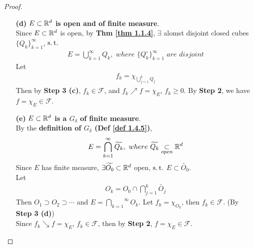 \begin{proof}
\begin{itemize}
\begin{enumerate}
				\item[\textbf{(d)}]\textbf{$E \subset \mathbb{R}^d$ is open and of finite measure}. \\
				Since $E \subset \mathbb{R}^d$ is open, by \textbf{Thm \ref{thm 1.1.4}}, $\exists$ alomst disjoint closed cubes $\{ Q_k \}_{k = 1}^{\infty}$, $\operatorname{s.t.}$
				\begin{align}
					E = \bigcup_{k = 1}^{\infty}{Q_k} , \,\, where \,\, \{ Q_{k}^{\circ} \}_{k = 1}^{\infty} \,\, are \,\, disjoint
				\end{align}
				Let
				\begin{align}
					f_k = \chi_{\bigcup_{j = 1}^{k}{Q_j}}
				\end{align}
				Then by \textbf{Step 3 (c)}, $f_k \in \mathcal{F}$, and $f_k \nearrow f = \chi_E$, $f_k \geq 0$. By \textbf{Step 2}, we have $f = \chi_E \in \mathcal{F}$.
				
				\vspace{6em}
				
				\item[\textbf{(e)}]\textbf{$E \subset \mathbb{R}^d$ is a $G_{\delta}$ of finite measure}. \\
				By the \textbf{definition of $G_{\delta}$ (Def \ref{def 1.4.5})}, 
				\begin{align}
					E = \bigcap_{k = 1}^{\infty}{\widetilde{Q_k}} , \,\, where \,\, \widetilde{Q_k} \underset{open}{\subset} \mathbb{R}^d
				\end{align}
				Since $E$ has finite measure, $\exists \widetilde{O_0} \subset \mathbb{R}^d$ open, $\operatorname{s.t.}$ $E \subset \widetilde{O_0}$. \\
				Let
				\begin{align}
					O_k = O_0 \cap \bigcap_{j = 1}^{k}{\widetilde{O_j}}
				\end{align}
				Then $O_1 \supset O_2 \supset \cdots$ and $E = \overset{\infty}{\underset{k = 1}{\bigcap}}{O_k}$. Let $f_k = \chi_{O_k}$, then $f_k \in \mathcal{F}$. (By \textbf{Step 3 (d)}) \\
				Since $f_k \searrow f = \chi_E$, $f_k \in \mathcal{F}$, then by \textbf{Step 2}, $f = \chi_E \in \mathcal{F}$.
 			\end{enumerate}
 		
 			\newpage
 			

\end{itemize}
\end{proof}
